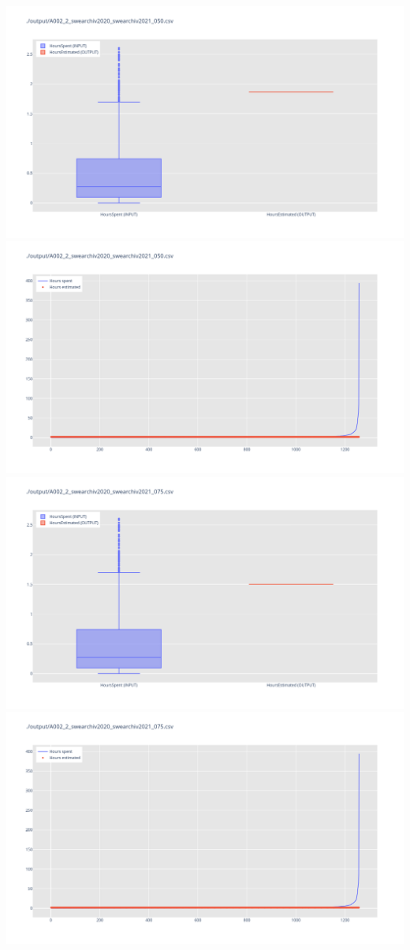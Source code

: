 \includegraphics[width=\textwidth]{Scripts/output/A002_2_swearchiv2020_swearchiv2021_050.csv.png}
\includegraphics[width=\textwidth]{Scripts/output/A002_2_swearchiv2020_swearchiv2021_050.csv.scatter.png}
\includegraphics[width=\textwidth]{Scripts/output/A002_2_swearchiv2020_swearchiv2021_075.csv.png}
\includegraphics[width=\textwidth]{Scripts/output/A002_2_swearchiv2020_swearchiv2021_075.csv.scatter.png}
